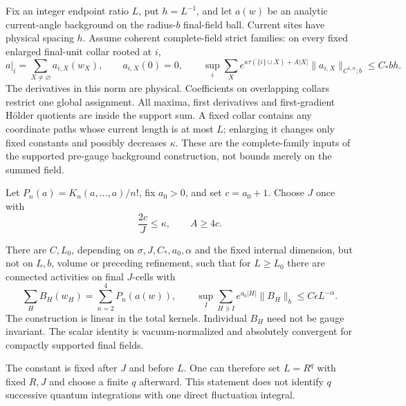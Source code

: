 Fix an integer endpoint ratio \(L\), put \(h=L^{-1}\), and let
\(a(w)\) be an analytic current-angle background on the radius-\(b\)
final-field ball. Current sites have physical spacing \(h\).
Assume coherent complete-field strict families: on every fixed
enlarged final-unit collar rooted at \(i\),
\begin{equation}
 a|_i=\sum_{X\ne\varnothing}a_{i,X}(w_X),\qquad
 a_{i,X}(0)=0,\qquad
 \sup_i\sum_X e^{\kappa\tau(\{i\}\cup X)+A|X|}
           \|a_{i,X}\|_{C^{1,\alpha};b}
       \le C_* b h .
 \label{lst-background}
\end{equation}
The derivatives in this norm are physical. Coefficients on
overlapping collars restrict one global assignment. All maxima,
first derivatives and first-gradient H\"older quotients are
inside the support sum. A fixed collar contains any coordinate
paths whose current length is at most \(L\); enlarging it changes
only fixed constants and possibly decreases \(\kappa\).
These are the complete-family inputs of the supported pre-gauge
background construction, not bounds merely on the summed field.

Let \(P_n(a)=K_n(a,\ldots,a)/n!\), fix \(a_0>0\), and set
\(c=a_0+1\). Choose \(J\) once with
\begin{equation}
 \frac{2c}{J}\le\kappa,\qquad A\ge4c .
 \label{lst-budgets}
\end{equation}

\begin{theorem}
\label{lst-theorem}
There are \(C,L_0\), depending on
\(\sigma,J,C_*,a_0,\alpha\) and the fixed internal dimension,
but not on \(L,b\), volume or preceding refinement, such that
for \(L\ge L_0\) there are connected activities on final \(J\)-cells
with
\begin{equation}
 \sum_H B_H(w_H)=\sum_{n=2}^4P_n(a(w)),\qquad
 \sup_I\sum_{H\ni I}e^{a_0|H|}\|B_H\|_b
                      \le C\epsilon L^{-\alpha}.
 \label{lst-conclusion}
\end{equation}
The construction is linear in the total kernels.
Individual \(B_H\) need not be gauge invariant.
The scalar identity is vacuum-normalized and absolutely
convergent for compactly supported final fields.
\end{theorem}

The constant is fixed after \(J\) and before \(L\).
One can therefore set \(L=R^q\) with fixed \(R,J\) and
choose a finite \(q\) afterward. This statement does not
identify \(q\) successive quantum integrations with one
direct fluctuation integral.


